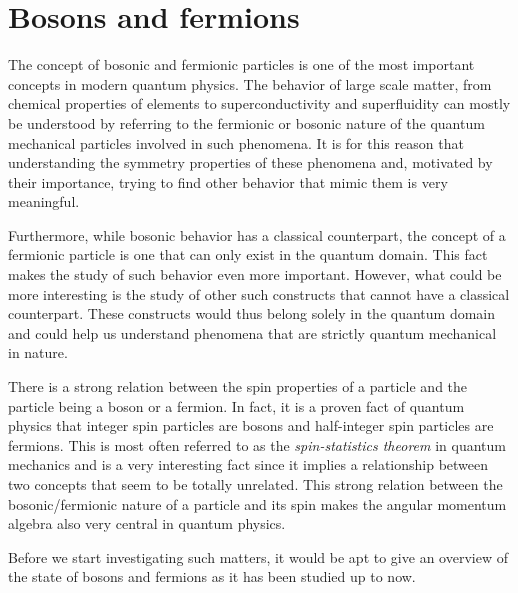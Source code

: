 \section{Bosons and fermions}
The concept of bosonic and fermionic particles is one of the most important concepts
in modern quantum physics. The behavior of large scale matter, from chemical
properties of elements to superconductivity and superfluidity can mostly be
understood by referring to the fermionic or bosonic nature of the quantum
mechanical particles involved in such phenomena. It is for this reason that
understanding the symmetry properties of these phenomena and, motivated by their
importance, trying to find other behavior that mimic them is very meaningful.

Furthermore, while bosonic behavior has a classical counterpart, the
concept of a fermionic particle is one that can only exist in the quantum
domain. This fact makes the study of such behavior even more important.
However, what could be more interesting is the study of other such
constructs that cannot have a classical counterpart. These constructs would
thus belong solely in the quantum domain and could help us understand phenomena
that are strictly quantum mechanical in nature.

There is a strong relation between the spin properties of a particle and
the particle being a boson or a fermion. In fact, it is a proven fact of
quantum physics that integer spin particles are bosons and half-integer spin
particles are fermions. This is most often referred to as the {\it spin-statistics
theorem} in quantum mechanics and is a very interesting fact since it implies
a relationship between two concepts that seem to be totally unrelated. This
strong relation between the bosonic/fermionic nature of a particle and its spin
makes the angular momentum algebra also very central in quantum physics.

Before we start investigating such matters, it would be apt to give an
overview of the state of bosons and fermions as it has been studied up to now.

